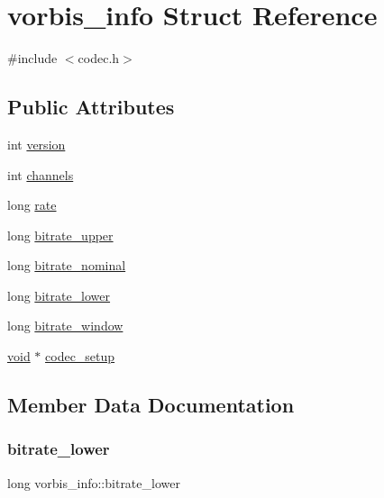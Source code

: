 \hypertarget{structvorbis__info}{}\section{vorbis\+\_\+info Struct Reference}
\label{structvorbis__info}


{\ttfamily \#include $<$codec.\+h$>$}

\subsection*{Public Attributes}
\begin{DoxyCompactItemize}
\item 
int \mbox{\hyperlink{structvorbis__info_a2d832259b1e3fbf4d1cd619ab5743612}{version}}
\item 
int \mbox{\hyperlink{structvorbis__info_a4240e042b91744b4fd810426f18252b4}{channels}}
\item 
long \mbox{\hyperlink{structvorbis__info_a01879ed23ecd9605cf6779ef2663a681}{rate}}
\item 
long \mbox{\hyperlink{structvorbis__info_a2d9d0e0725ae71c855ad39ce07bf7c88}{bitrate\+\_\+upper}}
\item 
long \mbox{\hyperlink{structvorbis__info_a71127d3e35c30fa110d7f321302a91b8}{bitrate\+\_\+nominal}}
\item 
long \mbox{\hyperlink{structvorbis__info_a216284288febd46a5547901cd5e6cd62}{bitrate\+\_\+lower}}
\item 
long \mbox{\hyperlink{structvorbis__info_aa511ecfc9eee8129df8f70e62ed08dc7}{bitrate\+\_\+window}}
\item 
\mbox{\hyperlink{_s_d_l__opengles2__gl2ext_8h_ae5d8fa23ad07c48bb609509eae494c95}{void}} $\ast$ \mbox{\hyperlink{structvorbis__info_a440988f081a417fd1586a4c3d44bc00c}{codec\+\_\+setup}}
\end{DoxyCompactItemize}


\subsection{Member Data Documentation}
\mbox{\label{structvorbis__info_a216284288febd46a5547901cd5e6cd62}} 
\subsubsection{\texorpdfstring{bitrate\+\_\+lower}{bitrate\_lower}}
{\footnotesize\ttfamily long vorbis\+\_\+info\+::bitrate\+\_\+lower}

